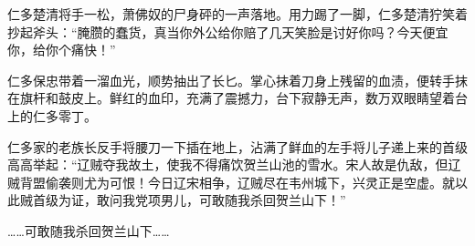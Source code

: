 仁多楚清将手一松，萧佛奴的尸身砰的一声落地。用力踢了一脚，仁多楚清狞笑着抄起斧头：“腌臜的蠢货，真当你外公给你赔了几天笑脸是讨好你吗？今天便宜你，给你个痛快！”

仁多保忠带着一溜血光，顺势抽出了长匕。掌心抹着刀身上残留的血渍，便转手抹在旗杆和鼓皮上。鲜红的血印，充满了震撼力，台下寂静无声，数万双眼睛望着台上的仁多零丁。

仁多家的老族长反手将腰刀一下插在地上，沾满了鲜血的左手将儿子递上来的首级高高举起：“辽贼夺我故土，使我不得痛饮贺兰山池的雪水。宋人故是仇敌，但辽贼背盟偷袭则尤为可恨！今日辽宋相争，辽贼尽在韦州城下，兴灵正是空虚。就以此贼首级为证，敢问我党项男儿，可敢随我杀回贺兰山下！”

……可敢随我杀回贺兰山下……

